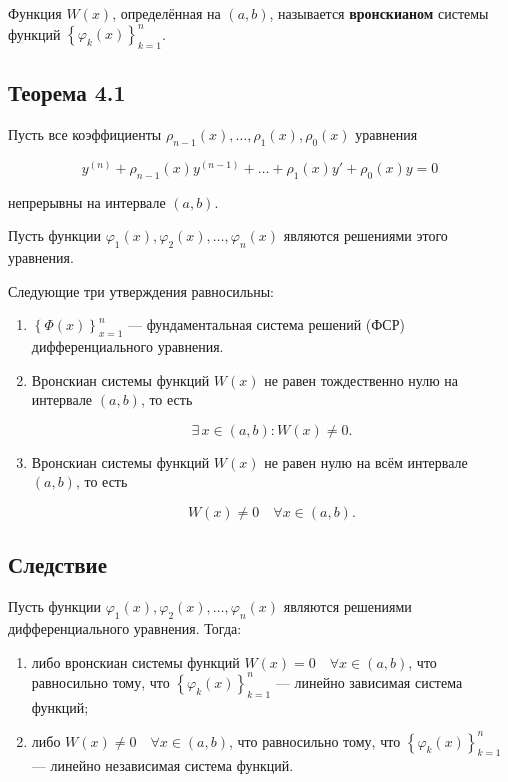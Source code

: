 {	Функция \( W(x) \), определённая на \( (a, b) \), называется \textbf{вронскианом} системы функций \( \left\{ \varphi_k(x) \right\}_{k=1}^{n} \).


	\subsection*{Теорема 4.1}

	Пусть все коэффициенты \( \rho_{n-1}(x), \ldots, \rho_1(x), \rho_0(x) \) уравнения


	\[
	y^{(n)} + \rho_{n-1}(x)y^{(n-1)} + \ldots + \rho_1(x)y' + \rho_0(x)y = 0 \tag{4.1}
	\]


	непрерывны на интервале \( (a, b) \).

	Пусть функции \( \varphi_1(x), \varphi_2(x), \ldots, \varphi_n(x) \) являются решениями этого уравнения.

	Следующие три утверждения равносильны:

	\begin{enumerate}
		\item \( \left\{ \Phi(x) \right\}_{x=1}^{n} \) — фундаментальная система решений (ФСР) дифференциального уравнения.
	  
		\item Вронскиан системы функций \( W(x) \) не равен тождественно нулю на интервале \( (a, b) \), то есть
		
	  
	  \[
		\exists \, x \in (a, b) : W(x) \neq 0.
		\]
	  
	  
	  
		\item Вронскиан системы функций \( W(x) \) не равен нулю на всём интервале \( (a, b) \), то есть
		
	  
	  \[
		W(x) \neq 0 \quad \forall x \in (a, b).
		\]
	  
	  
	  \end{enumerate}


	\subsection*{Следствие}

	Пусть функции \( \varphi_1(x), \varphi_2(x), \ldots, \varphi_n(x) \) являются решениями дифференциального уравнения. Тогда:

	\begin{enumerate}
	\item либо вронскиан системы функций \( W(x) = 0 \quad \forall x \in (a, b) \), что равносильно тому, что \( \left\{ \varphi_k(x) \right\}_{k=1}^{n} \) — линейно зависимая система функций;

	\item либо \( W(x) \neq 0 \quad \forall x \in (a, b) \), что равносильно тому, что \( \left\{ \varphi_k(x) \right\}_{k=1}^{n} \) — линейно независимая система функций.
	\end{enumerate}

	\newpage
}